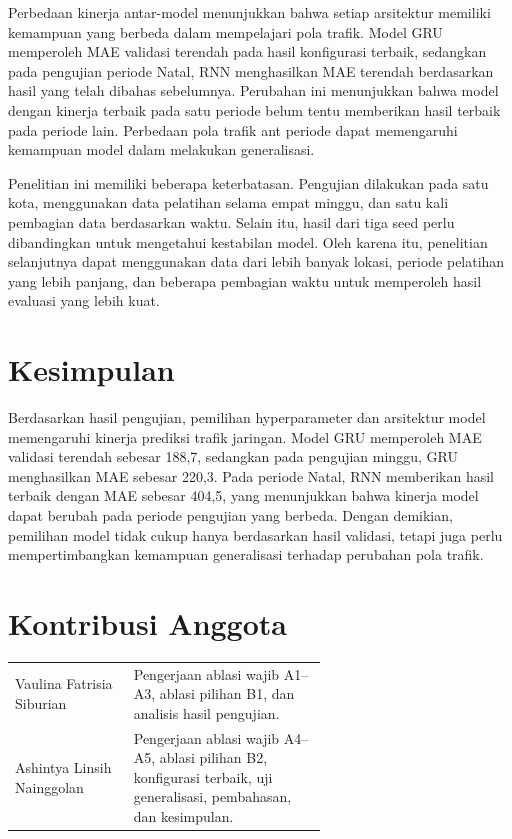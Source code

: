 \documentclass[conference,a4paper]{IEEEtran}
\begin{document}
Perbedaan kinerja antar-model menunjukkan bahwa setiap arsitektur memiliki kemampuan yang berbeda dalam mempelajari pola trafik. Model GRU memperoleh MAE validasi terendah pada hasil konfigurasi terbaik, sedangkan pada pengujian periode Natal, RNN menghasilkan MAE terendah berdasarkan hasil yang telah dibahas sebelumnya. Perubahan ini menunjukkan bahwa model dengan kinerja terbaik pada satu periode belum tentu memberikan hasil terbaik pada periode lain. Perbedaan pola trafik ant periode dapat memengaruhi kemampuan model dalam melakukan generalisasi.

Penelitian ini memiliki beberapa keterbatasan. Pengujian dilakukan pada satu kota, menggunakan data pelatihan selama empat minggu, dan satu kali pembagian data berdasarkan waktu. Selain itu, hasil dari tiga seed perlu dibandingkan untuk mengetahui kestabilan model. Oleh karena itu, penelitian selanjutnya dapat menggunakan data dari lebih banyak lokasi, periode pelatihan yang lebih panjang, dan beberapa pembagian waktu untuk memperoleh hasil evaluasi yang lebih kuat.

\section{Kesimpulan}
Berdasarkan hasil pengujian, pemilihan hyperparameter dan arsitektur model memengaruhi kinerja prediksi trafik jaringan. Model GRU memperoleh MAE validasi terendah sebesar 188,7, sedangkan pada pengujian minggu, GRU menghasilkan MAE sebesar 220,3. Pada periode Natal, RNN memberikan hasil terbaik dengan MAE sebesar 404,5, yang menunjukkan bahwa kinerja model dapat berubah pada periode pengujian yang berbeda. Dengan demikian, pemilihan model tidak cukup hanya berdasarkan hasil validasi, tetapi juga perlu mempertimbangkan kemampuan generalisasi terhadap perubahan pola trafik.

\section*{Kontribusi Anggota}
\begin{tabular}{@{}lp{0.62\linewidth}@{}}
  Vaulina Fatrisia Siburian & Pengerjaan ablasi wajib A1--A3, ablasi pilihan B1, dan analisis hasil pengujian. \\
  Ashintya Linsih Nainggolan & Pengerjaan ablasi wajib A4--A5, ablasi pilihan B2, konfigurasi terbaik, uji generalisasi, pembahasan, dan kesimpulan. \\
\end{tabular}
\end{document}
